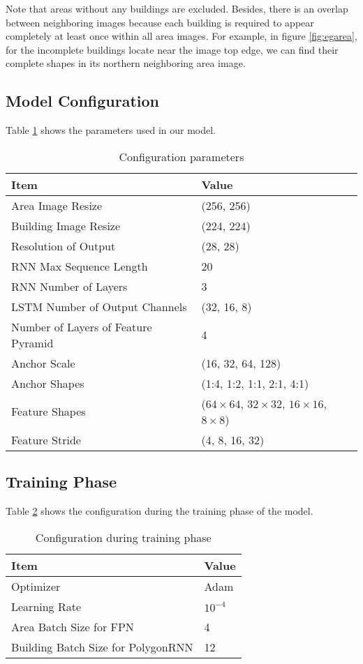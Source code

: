 Note that areas without any buildings are excluded. Besides, there is an overlap between neighboring images because each building is required to appear completely at least once within all area images. For example, in figure \ref{fig:egarea}, for the incomplete buildings locate near the image top edge, we can find their complete shapes in its northern neighboring area image.

\subsection{Model Configuration}\label{config}

Table \ref{tab:configpara} shows the parameters used in our model.

\begin{table}[!h]
	\centering
	\caption[Configuration parameters.]{Configuration parameters}
	\label{tab:configpara}
	\begin{tabular}{l|l}
	\hline
	Item & Value \\
	\hline
	Area Image Resize & (256, 256) \\
	Building Image Resize & (224, 224) \\
	Resolution of Output & (28, 28) \\
	\hline
	RNN Max Sequence Length & 20 \\
	RNN Number of Layers & 3 \\
	LSTM Number of Output Channels & (32, 16, 8) \\
	\hline
	Number of Layers of Feature Pyramid & 4 \\
	Anchor Scale & (16, 32, 64, 128) \\
	Anchor Shapes & (1:4, 1:2, 1:1, 2:1, 4:1) \\
	Feature Shapes & ($64\times64$, $32\times32$, $16\times16$, $8\times8$) \\
	Feature Stride & (4, 8, 16, 32) \\
	\hline
	\end{tabular}
\end{table}

\subsection{Training Phase}\label{trnphs}

Table \ref{tab:trnphs} shows the configuration during the training phase of the model.

\begin{table}[!h]
	\centering
	\caption[Configuration during training phase.]{Configuration during training phase}
	\label{tab:trnphs}
	\begin{tabular}{l|l}
	\hline
	Item & Value \\
	\hline
	Optimizer & Adam \\
	Learning Rate & $10^{-4}$ \\
	Area Batch Size for FPN & 4 \\
	Building Batch Size for PolygonRNN & 12 \\
	\hline
	\end{tabular}
\end{table}

